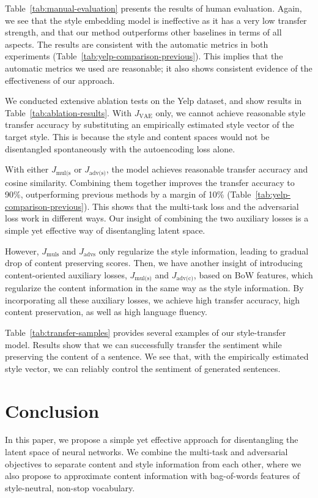 \documentclass[letterpaper]{article} %
\newcommand{\loss}[1]{J_{\text{#1}}}
\begin{document}
Table~\ref{tab:manual-evaluation} presents the results of human evaluation. Again, we see that the style embedding model \cite{fu2018style} is ineffective as it has a very low transfer strength, and that our method outperforms other baselines in terms of all aspects. The results are consistent with the automatic metrics in both experiments (Table~\ref{tab:yelp-comparison-previous}). This implies that the automatic metrics we used are reasonable; it also shows consistent evidence of the effectiveness of our approach.

We conducted extensive ablation tests on the Yelp dataset, and show results in Table~\ref{tab:ablation-results}. With $\loss{VAE}$ only, we cannot achieve reasonable style transfer accuracy by substituting an empirically estimated style vector of the target style.  This is because the style and content spaces would not be disentangled spontaneously with the autoencoding loss alone.

With either $\loss{mul(s}$ or $\loss{adv(s)}$, the model achieves reasonable transfer accuracy and cosine similarity. Combining them together improves the transfer accuracy to 90\%, outperforming previous methods by a margin of 10\% (Table~\ref{tab:yelp-comparison-previous}). This shows that the multi-task loss and the adversarial loss work in different ways. Our insight of combining the two auxiliary losses is a simple yet effective way of disentangling latent space.

However, $\loss{mul{s}}$ and $\loss{adv{s}}$ only regularize the style information, leading to gradual drop of content preserving scores. Then, we have another insight of introducing content-oriented auxiliary losses, $\loss{mul(s)}$ and $\loss{adv(c)}$, based on BoW features, which regularize the content information in the same way as the style information. By incorporating all these auxiliary losses, we achieve high transfer accuracy, high content preservation, as well as high language fluency.


Table~\ref{tab:transfer-samples} provides several examples of our style-transfer model. Results show that we can successfully transfer the sentiment while preserving the content of a sentence.
We see that, with the empirically estimated style vector, we can reliably control the sentiment of generated sentences.

\section{Conclusion}
In this paper, we propose a simple yet effective approach for disentangling the latent space of neural networks. We combine the multi-task and adversarial objectives to separate content and style information from each other, where we also propose to approximate content information with bag-of-words features of style-neutral, non-stop vocabulary.
\end{document}
